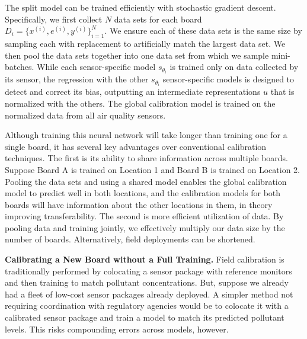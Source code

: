 \documentclass[journal abbreviation, manuscript]{copernicus}
\newcommand\todo[1]{\textcolor{red}{#1}}
\begin{document}
The split model can be trained efficiently with stochastic gradient descent. Specifically, we first collect $N$ data sets for each board $D_i = \{x^{(i)}, e^{(i)}, y^{(i)}\}_{i = 1}^N$. We ensure each of these data sets is the same size by sampling each with replacement to artificially match the largest data set. We then pool the data sets together into one data set from which we sample mini-batches. While each sensor-specific model $s_{\theta_i}$ is trained only on data collected by its sensor, the regression with the other $s_{\theta_i}$ sensor-specific models is designed to detect and correct its bias, outputting an intermediate representations $u$ that is normalized with the others.  The global calibration model is trained on the normalized data from all air quality sensors.


Although training this neural network will take longer than training one for a single board, it has several key advantages over conventional calibration techniques. The first is its ability to share information across multiple boards. Suppose Board A is trained on Location 1 and Board B is trained on Location 2. Pooling the data sets and using a shared model enables the global calibration model to predict well in both locations, and the calibration models for both boards will have information about the other locations in them, in theory improving transferability. The second is more efficient utilization of data. By pooling data and training jointly, we effectively multiply our data size by the number of boards.  Alternatively, field deployments can be shortened.

\textbf{Calibrating a New Board without a Full Training.}  Field calibration is traditionally performed by colocating a sensor package with reference monitors and then training to match pollutant concentrations.  But, suppose we already had a fleet of low-cost sensor packages already deployed.  A simpler method not requiring coordination with regulatory agencies would be to colocate it with a calibrated sensor package and train a model to match its predicted pollutant levels. This risks compounding errors across models, however. 
\end{document}

